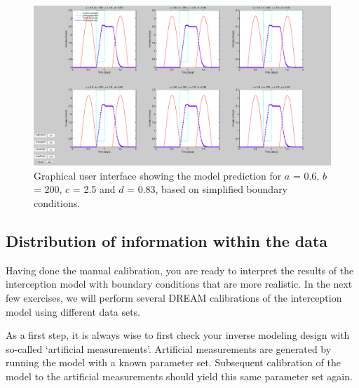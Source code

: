 \begin{figure}
  \centering
    \includegraphics[width=1.0\textheight]{./../eps/interceptionmodel-mancal-gui.eps}
  \caption{Graphical user interface showing the model prediction for $a$ = 0.6, $b$ = 200, $c$ = 2.5 and $d$ = 0.83, based on simplified boundary conditions.}
  \label{fig:interceptionmodel-mancal-gui}
\end{figure}



\subsection{Distribution of information within the data}

Having done the manual calibration, you are ready to interpret the results of the interception model with boundary conditions that are more realistic. In the next few exercises, we will perform several DREAM calibrations of the interception model using  different data sets.

As a first step, it is always wise to first check your inverse modeling design with so-called `artificial measurements'. Artificial measurements are generated by running the model with a known parameter set. Subsequent calibration of the model to the artificial measurements should yield this same parameter set again. 

